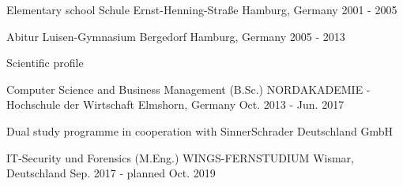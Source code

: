 

\begin{cventries}

  \cventry
    {Elementary school} %
    {Schule Ernst-Henning-Straße} %
    {Hamburg, Germany} %
    {2001 - 2005} %
    {}

  \cventry
    {Abitur} %
    {Luisen-Gymnasium Bergedorf} %
    {Hamburg, Germany} %
    {2005 - 2013} %
    {
      \begin{cvitems} %
        \item {Scientific profile}
      \end{cvitems}
    }

  \cventry
    {Computer Science and Business Management (B.Sc.)} %
    {NORDAKADEMIE - Hochschule der Wirtschaft} %
    {Elmshorn, Germany} %
    {Oct. 2013 - Jun. 2017} %
    {
      \begin{cvitems} %
        \item {Dual study programme in cooperation with SinnerSchrader Deutschland GmbH}
      \end{cvitems}
    }

  \cventry
    {IT-Security und Forensics (M.Eng.)} %
    {WINGS-FERNSTUDIUM} %
    {Wismar, Deutschland} %
    {Sep. 2017 - planned Oct. 2019} %
    {}

\end{cventries}

